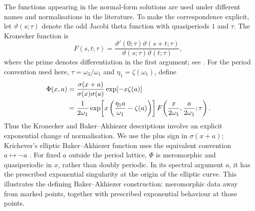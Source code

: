 \documentclass[11pt,a4paper]{article}
\numberwithin{equation}{section}
\begin{document}
The functions appearing in the normal-form solutions are used under different names and normalisations in the literature.
To make the correspondence explicit, let $\vartheta(s;\tau)$ denote the odd Jacobi theta function with quasiperiods $1$ and $\tau$.
The Kronecker function is
\begin{equation}
F(s,t;\tau)=
\frac{\vartheta'(0;\tau)\vartheta(s+t;\tau)}
{\vartheta(s;\tau)\vartheta(t;\tau)},
\label{eq:kronecker-kernel}
\end{equation}
where the prime denotes differentiation in the first argument; see \cite[Section~3.4]{brownMultipleEllipticPolylogarithms2013}.
For the period convention used here, $\tau=\omega_3/\omega_1$ and $\eta_1=\zeta(\omega_1)$, define
\begin{align}
\Phi(x,a)
&=\frac{\sigma(x+a)}{\sigma(x)\sigma(a)}\exp[-x\zeta(a)] \notag\\
&=\frac{1}{2\omega_1}
\exp\!\left[x\left(\frac{\eta_1a}{\omega_1}-\zeta(a)\right)\right]
F\!\left(\frac{x}{2\omega_1},\frac{a}{2\omega_1};\tau\right).
\label{eq:ba-kronecker}
\end{align}
Thus the Kronecker and Baker--Akhiezer descriptions involve an explicit exponential change of normalisation.
We use the plus sign in $\sigma(x+a)$; Krichever's elliptic Baker--Akhiezer function uses the equivalent convention $a\mapsto-a$ \cite[Eq.~(1.7)]{kricheverEllipticSolutionsNonlinear1994}.
For fixed $a$ outside the period lattice, $\Phi$ is meromorphic and quasiperiodic in $x$, rather than doubly periodic.
In its spectral argument $a$, it has the prescribed exponential singularity at the origin of the elliptic curve.
This illustrates the defining Baker--Akhiezer construction: meromorphic data away from marked points, together with prescribed exponential behaviour at those points.
\end{document}
